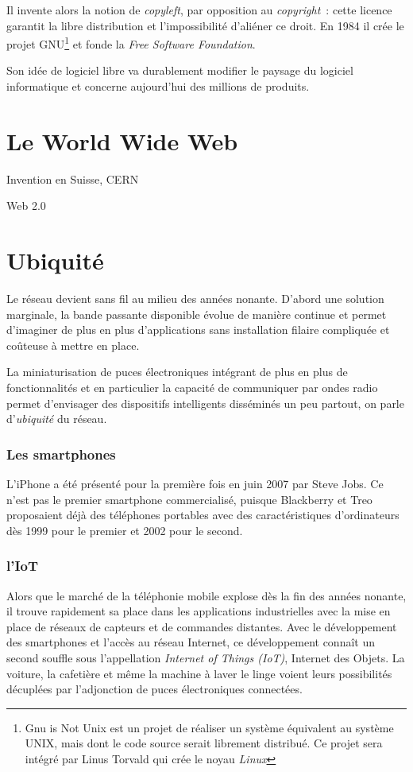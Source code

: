 \documentclass[a4paper,11pt]{book}
\begin{document}
Il invente alors la notion de \textit{copyleft}, par opposition au \textit{copyright}~: cette licence garantit la libre distribution et l'impossibilité d'aliéner ce droit. En 1984 il crée le projet GNU\footnote{Gnu is Not Unix est un projet de réaliser un système équivalent au système UNIX, mais dont le code source serait librement distribué. Ce projet sera intégré par Linus Torvald qui crée le noyau \textit{Linux}} et fonde la \textit{Free Software Foundation}.

Son idée de logiciel libre va durablement modifier le paysage du logiciel informatique et concerne aujourd'hui des millions de produits.

\section{Le World Wide Web}
Invention en Suisse, CERN

Web 2.0 

\section{Ubiquité}
Le réseau devient sans fil au milieu des années nonante. D'abord une solution marginale, la bande passante disponible évolue de manière continue et permet d'imaginer de plus en plus d'applications sans installation filaire compliquée et coûteuse à mettre en place.

La miniaturisation de puces électroniques intégrant de plus en plus de fonctionnalités et en particulier la capacité de communiquer par ondes radio permet d'envisager des dispositifs intelligents disséminés un peu partout, on parle d'\textit{ubiquité} du réseau.

\subsubsection{Les smartphones}
L'iPhone a été présenté pour la première fois en juin 2007 par Steve Jobs. Ce n'est pas le premier smartphone commercialisé, puisque Blackberry et Treo proposaient déjà des téléphones portables avec des caractéristiques d'ordinateurs dès 1999 pour le premier et 2002 pour le second.

\subsubsection{l'IoT}
Alors que le marché de la téléphonie mobile explose dès la fin des années nonante, il trouve rapidement sa place dans les applications industrielles avec la mise en place de réseaux de capteurs et de commandes distantes. Avec le développement des smartphones et l'accès au réseau Internet, ce développement connaît un second souffle sous l'appellation \textit{Internet of Things (IoT)}, Internet des Objets. La voiture, la cafetière et même la machine à laver le linge voient leurs possibilités décuplées par l'adjonction de puces électroniques connectées.
\end{document}
